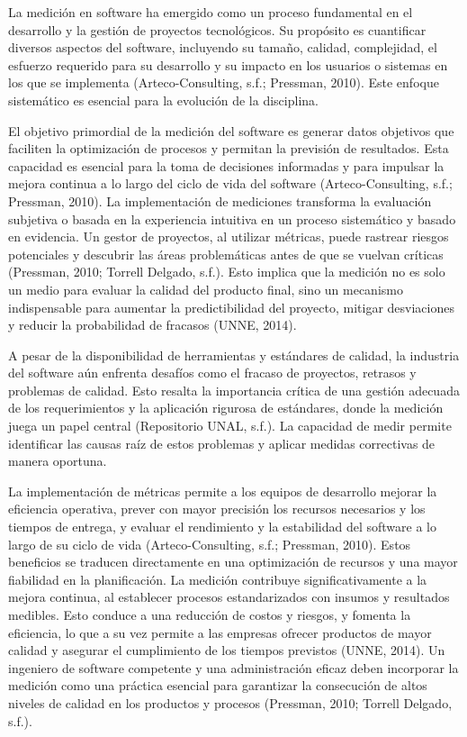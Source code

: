 \documentclass[11pt]{article}
\begin{document}
La medición en software ha emergido como un proceso fundamental en el desarrollo y la gestión de proyectos tecnológicos. Su propósito es cuantificar diversos aspectos del software, incluyendo su tamaño, calidad, complejidad, el esfuerzo requerido para su desarrollo y su impacto en los usuarios o sistemas en los que se implementa (Arteco-Consulting, s.f.; Pressman, 2010). Este enfoque sistemático es esencial para la evolución de la disciplina.

El objetivo primordial de la medición del software es generar datos objetivos que faciliten la optimización de procesos y permitan la previsión de resultados. Esta capacidad es esencial para la toma de decisiones informadas y para impulsar la mejora continua a lo largo del ciclo de vida del software (Arteco-Consulting, s.f.; Pressman, 2010). La implementación de mediciones transforma la evaluación subjetiva o basada en la experiencia intuitiva en un proceso sistemático y basado en evidencia. Un gestor de proyectos, al utilizar métricas, puede rastrear riesgos potenciales y descubrir las áreas problemáticas antes de que se vuelvan críticas (Pressman, 2010; Torrell Delgado, s.f.). Esto implica que la medición no es solo un medio para evaluar la calidad del producto final, sino un mecanismo indispensable para aumentar la predictibilidad del proyecto, mitigar desviaciones y reducir la probabilidad de fracasos (UNNE, 2014).

A pesar de la disponibilidad de herramientas y estándares de calidad, la industria del software aún enfrenta desafíos como el fracaso de proyectos, retrasos y problemas de calidad. Esto resalta la importancia crítica de una gestión adecuada de los requerimientos y la aplicación rigurosa de estándares, donde la medición juega un papel central (Repositorio UNAL, s.f.). La capacidad de medir permite identificar las causas raíz de estos problemas y aplicar medidas correctivas de manera oportuna.

La implementación de métricas permite a los equipos de desarrollo mejorar la eficiencia operativa, prever con mayor precisión los recursos necesarios y los tiempos de entrega, y evaluar el rendimiento y la estabilidad del software a lo largo de su ciclo de vida (Arteco-Consulting, s.f.; Pressman, 2010). Estos beneficios se traducen directamente en una optimización de recursos y una mayor fiabilidad en la planificación. La medición contribuye significativamente a la mejora continua, al establecer procesos estandarizados con insumos y resultados medibles. Esto conduce a una reducción de costos y riesgos, y fomenta la eficiencia, lo que a su vez permite a las empresas ofrecer productos de mayor calidad y asegurar el cumplimiento de los tiempos previstos (UNNE, 2014). Un ingeniero de software competente y una administración eficaz deben incorporar la medición como una práctica esencial para garantizar la consecución de altos niveles de calidad en los productos y procesos (Pressman, 2010; Torrell Delgado, s.f.).
\end{document}
